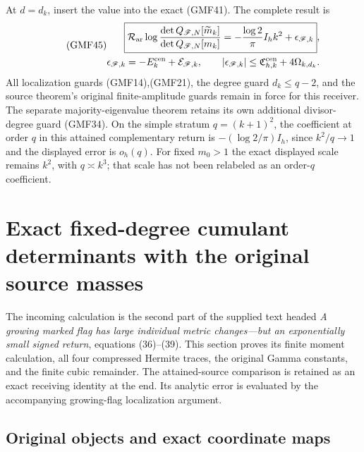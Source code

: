 \documentclass[11pt]{article}
\newcommand{\Fcal}{\mathscr F}
\begin{document}
At \(d=d_k\), insert the value into the exact (GMF41).
The complete result is
\begin{equation}\tag{GMF45}
\begin{split}
 \boxed{
 \mathcal R_{\rm ar}
 \log\frac{\det Q_{\Fcal,N}[\widetilde m_k]}
              {\det Q_{\Fcal,N}[m_k]}
 =-\frac{\log2}{\pi}I_h k^2+\epsilon_{\Fcal,k}},\\
 \epsilon_{\Fcal,k}=-E_k^{\rm cen}+\mathcal E_{\Fcal,k},
 \qquad
 |\epsilon_{\Fcal,k}|
 \le\mathfrak C_{h,k}^{\rm cen}+4\Omega_{k,d_k}.
\end{split}
\end{equation}
All localization guards (GMF14),(GMF21), the degree
guard \(d_k\le q-2\), and the source theorem's original
finite-amplitude guards remain in force for this receiver.
The separate majority-eigenvalue theorem retains its
own additional divisor-degree guard (GMF34).
On the simple stratum \(q=(k+1)^2\), the coefficient at
order \(q\) in this attained complementary return is
\(-(\log2/\pi)I_h\), since \(k^2/q\to1\) and the displayed
error is \(o_h(q)\).
For fixed \(m_0>1\) the exact displayed scale remains
\(k^2\), with \(q\asymp k^3\); that scale has not been
relabeled as an order-\(q\) coefficient.

\section{Exact fixed-degree cumulant determinants with the original source masses}
\label{sec:FCD}

The incoming calculation is the second part of the supplied text headed
\emph{A growing marked flag has large individual metric changes---but an
exponentially small signed return}, equations (36)--(39).
This section proves its finite moment calculation, all four compressed
Hermite traces, the original Gamma constants, and the finite cubic
remainder. The attained-source comparison is retained as an exact receiving
identity at the end. Its analytic error is evaluated by the accompanying
growing-flag localization argument.

\subsection{Original objects and exact coordinate maps}
\end{document}
